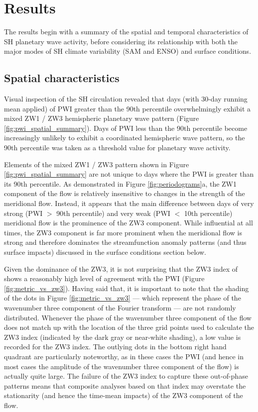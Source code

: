 \section{Results}

The results begin with a summary of the spatial and temporal characteristics of SH planetary wave activity, before considering its relationship with both the major modes of SH climate variability (SAM and ENSO) and surface conditions. 

\subsection{Spatial characteristics}\label{s:spatial_characteristics}

Visual inspection of the SH circulation revealed that days (with 30-day running mean applied) of PWI greater than the 90th percentile overwhelmingly exhibit a mixed ZW1 / ZW3 hemispheric planetary wave pattern (Figure \ref{fig:pwi_spatial_summary}). Days of PWI less than the 90th percentile become increasingly unlikely to exhibit a coordinated hemispheric wave pattern, so the 90th percentile was taken as a threshold value for planetary wave activity. 

Elements of the mixed ZW1 / ZW3 pattern shown in Figure \ref{fig:pwi_spatial_summary} are not unique to days where the PWI is greater than its 90th percentile. As demonstrated in Figure \ref{fig:periodograms}a, the ZW1 component of the flow is relatively insensitive to changes in the strength of the meridional flow. Instead, it appears that the main difference between days of very strong (PWI $>$ 90th percentile) and very weak (PWI $<$ 10th percentile) meridional flow is the prominence of the ZW3 component. While influential at all times, the ZW3 component is far more prominent when the meridional flow is strong and therefore dominates the streamfunction anomaly patterns (and thus surface impacts) discussed in the surface conditions section below. 

Given the dominance of the ZW3, it is not surprising that the ZW3 index of \citet{Raphael2004} shows a reasonably high level of agreement with the PWI (Figure \ref{fig:metric_vs_zw3}). Having said that, it is important to note that the shading of the dots in Figure \ref{fig:metric_vs_zw3} --- which represent the phase of the wavenumber three component of the Fourier transform --- are not randomly distributed. Whenever the phase of the wavenumber three component of the flow does not match up with the location of the three grid points used to calculate the ZW3 index (indicated by the dark gray or near-white shading), a low value is recorded for the ZW3 index. The outlying dots in the bottom right hand quadrant are particularly noteworthy, as in these cases the PWI (and hence in most cases the amplitude of the wavenumber three component of the flow) is actually quite large. The failure of the ZW3 index to capture these out-of-phase patterns means that composite analyses based on that index may overstate the stationarity (and hence the time-mean impacts) of the ZW3 component of the flow.
    
    
  